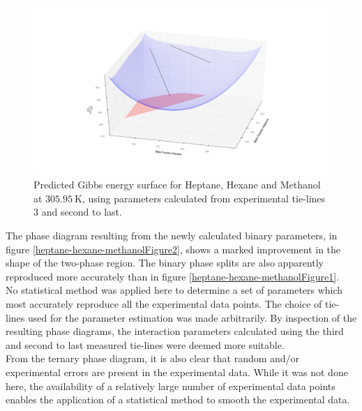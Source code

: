 \begin{figure}[h]
\vspace{40pt}
\centering
\includegraphics[width = \textwidth, bb=100 100 1600 700]{Results_Parts/TernaryParams/heptane-hexane-methanol/DWPMTieline3and-2/rotation6.png}
\caption{Predicted Gibbs energy surface for Heptane, Hexane and Methanol at $305.95~\mathrm{K}$, using parameters calculated from experimental tie-lines 3 and second to last.}
\label{heptane-hexane-methanolGibbsEnergySurface2}
\end{figure}	

The phase diagram resulting from the newly calculated binary parameters, in figure \ref{heptane-hexane-methanolFigure2}, shows a marked improvement in the shape of the two-phase region. The binary phase splits are also apparently reproduced more accurately than in figure \ref{heptane-hexane-methanolFigure1}.\\

No statistical method was applied here to determine a set of parameters which most accurately reproduce all the experimental data points. The choice of tie-lines used for the parameter estimation was made arbitrarily. By inspection of the resulting phase diagrams, the interaction parameters calculated using the third and second to last measured tie-lines were deemed more suitable.\\

From the ternary phase diagram, it is also clear that random and/or experimental errors are present in the experimental data. While it was not done here, the availability of a relatively large number of experimental data points enables the application of a statistical method to smooth the experimental data.\\

